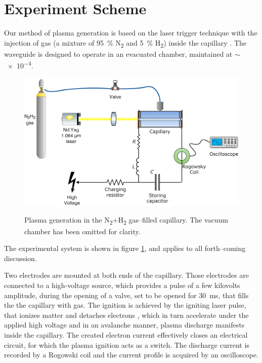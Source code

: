 \documentclass[../main.tex]{subfiles}
\begin{document}
\section{Experiment Scheme}\label{sec:experiment_scheme}
Our method of plasma generation is based on the laser trigger technique with the injection of gas (a mixture of \SI{95}{\percent} N\textsubscript{2} and \SI{5}{\percent} H\textsubscript{2}) inside the capillary \cite{Bobrova2002SimulationsWaveguide,Spence2001InvestigationWaveguide}.
The waveguide is designed to operate in an evacuated chamber, maintained at $\sim$\SI{e-4}{\torr}.
\begin{figure}
\centering
    \includegraphics[width=\textwidth]{figures/Laser-based ignition scheme.png}
    \label{fig:scheme}
    \caption{Plasma generation in the N\textsubscript{2}+H\textsubscript{2} gas--filled capillary. The vacuum chamber has been omitted for clarity.}
    \end{figure}
The experimental system is shown in figure \ref{fig:scheme}, and applies to all forth--coming discussion.

Two electrodes are mounted at both ends of the capillary. Those electrodes are connected to a high-voltage source, which provides a pulse of a few kilovolts amplitude, during the opening of a valve, set to be opened for \SI{30}{\ms}, that fills the the capillary with gas. The ignition is achieved by the igniting laser pulse, that ionizes matter and detaches electrons \cite{Palchan2007ElectronChannel}, which in turn accelerate under the applied high voltage and in an avalanche manner, plasma discharge manifests inside the capillary. The created electron current effectively closes an electrical circuit, for which the plasma ignition acts as a switch. The discharge current is recorded by a Rogowski coil  and the current profile is acquired by an oscilloscope.
\end{document}
